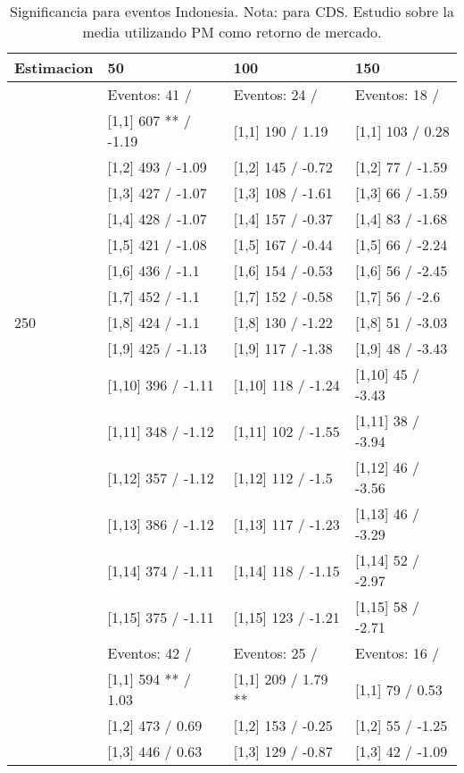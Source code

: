 \begin{table}

\caption{Significancia para eventos Indonesia. Nota: para CDS. Estudio sobre la media utilizando PM como retorno de mercado.}
\centering
\begin{tabular}[t]{llll}
\toprule
Estimacion & 50 & 100 & 150\\
\midrule
 & Eventos:  41 / & Eventos:  24 / & Eventos:  18 /\\
 & {}[1,1] 607 ** / -1.19 & {}[1,1] 190  / 1.19 & {}[1,1] 103  / 0.28\\
 & {}[1,2] 493  / -1.09 & {}[1,2] 145  / -0.72 & {}[1,2] 77  / -1.59\\
 & {}[1,3] 427  / -1.07 & {}[1,3] 108  / -1.61 & {}[1,3] 66  / -1.59\\
 & {}[1,4] 428  / -1.07 & {}[1,4] 157  / -0.37 & {}[1,4] 83  / -1.68\\
\addlinespace
 & {}[1,5] 421  / -1.08 & {}[1,5] 167  / -0.44 & {}[1,5] 66  / -2.24\\
 & {}[1,6] 436  / -1.1 & {}[1,6] 154  / -0.53 & {}[1,6] 56  / -2.45\\
 & {}[1,7] 452  / -1.1 & {}[1,7] 152  / -0.58 & {}[1,7] 56  / -2.6\\
250 & {}[1,8] 424  / -1.1 & {}[1,8] 130  / -1.22 & {}[1,8] 51  / -3.03\\
 & {}[1,9] 425  / -1.13 & {}[1,9] 117  / -1.38 & {}[1,9] 48  / -3.43\\
\addlinespace
 & {}[1,10] 396  / -1.11 & {}[1,10] 118  / -1.24 & {}[1,10] 45  / -3.43\\
 & {}[1,11] 348  / -1.12 & {}[1,11] 102  / -1.55 & {}[1,11] 38  / -3.94\\
 & {}[1,12] 357  / -1.12 & {}[1,12] 112  / -1.5 & {}[1,12] 46  / -3.56\\
 & {}[1,13] 386  / -1.12 & {}[1,13] 117  / -1.23 & {}[1,13] 46  / -3.29\\
 & {}[1,14] 374  / -1.11 & {}[1,14] 118  / -1.15 & {}[1,14] 52  / -2.97\\
\addlinespace
 & {}[1,15] 375  / -1.11 & {}[1,15] 123  / -1.21 & {}[1,15] 58  / -2.71\\
 & Eventos:  42 / & Eventos:  25 / & Eventos:  16 /\\
 & {}[1,1] 594 ** / 1.03 & {}[1,1] 209  / 1.79 ** & {}[1,1] 79  / 0.53\\
 & {}[1,2] 473  / 0.69 & {}[1,2] 153  / -0.25 & {}[1,2] 55  / -1.25\\
 & {}[1,3] 446  / 0.63 & {}[1,3] 129  / -0.87 & {}[1,3] 42  / -1.09\\

\end{tabular}
\end{table}
